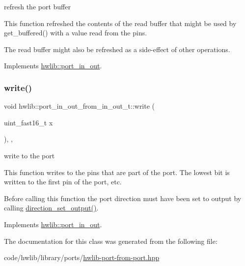 refresh the port buffer

This function refreshed the contents of the read buffer that might be used by get\+\_\+buffered() with a value read from the pins.

The read buffer might also be refreshed as a side-\/effect of other operations. 

Implements \hyperlink{classhwlib_1_1port__in__out_afa3680e36a05dd3f5a0eac1b63aac37c}{hwlib\+::port\+\_\+in\+\_\+out}.

\mbox{\label{classhwlib_1_1port__in__out__from__in__out__t_acf0e3831b73a125fed1bbf6e9986551c}} 
\subsubsection{\texorpdfstring{write()}{write()}}
{\footnotesize\ttfamily void hwlib\+::port\+\_\+in\+\_\+out\+\_\+from\+\_\+in\+\_\+out\+\_\+t\+::write (\begin{DoxyParamCaption}\item[{uint\+\_\+fast16\+\_\+t}]{x }\end{DoxyParamCaption})\hspace{0.3cm}{\ttfamily [inline]}, {\ttfamily [override]}, {\ttfamily [virtual]}}

write to the port

This function writes to the pins that are part of the port. The lowest bit is written to the first pin of the port, etc.

Before calling this function the port direction must have been set to output by calling \hyperlink{classhwlib_1_1port__in__out__from__in__out__t_aa148c50e132f6657d4c3a292b91896da}{direction\+\_\+set\+\_\+output()}. 

Implements \hyperlink{classhwlib_1_1port__in__out_a0019c1f35d6f7b1d3ace6b22da86ecec}{hwlib\+::port\+\_\+in\+\_\+out}.



The documentation for this class was generated from the following file\+:\begin{DoxyCompactItemize}
\item 
code/hwlib/library/ports/\hyperlink{hwlib-port-from-port_8hpp}{hwlib-\/port-\/from-\/port.\+hpp}\end{DoxyCompactItemize}
